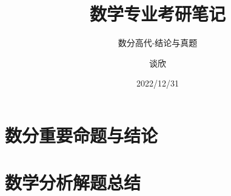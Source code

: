 \documentclass[lang=cn,newtx,12pt,scheme=chinese]{elegantbook}
\title{数学专业考研笔记}
\subtitle{数分高代-结论与真题}
\author{谈欣}
\institute{湖北第二师范学院数学与统计学院}
\date{2022/12/31}
\begin{document}
	
	\maketitle\frontmatter\tableofcontents\mainmatter
	
	\chapter{数分重要命题与结论}\newpage
	
	
	\newpage
	
	
	
	\newpage
	
	\newpage
	\newpage
	\newpage
	
	\newpage
	\newpage
	\newpage
	
	\newpage
	\newpage
	
	\newpage
	\newpage
	\newpage
	
	\newpage
	\newpage
	
	\newpage
	\newpage
	\newpage
	\newpage
	\newpage
	
	\newpage
	
	\newpage
	
	\newpage
	\newpage
	
	\newpage
	
	
	
	\chapter{数学分析解题总结}\newpage
	
	\newpage
	\newpage
	\newpage


	
	
	
\end{document}
